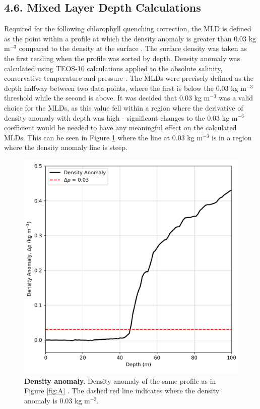 \documentclass[
	a4paper, %
	10pt, %
	unnumberedsections, %
	twoside, %
]{LTJournalArticle}
\begin{document}
\begin{multicols}{2}
\subsection{4.6. Mixed Layer Depth Calculations}
Required for the following chlorophyll quenching correction, the MLD is defined as the point within a profile at which the density
anomaly is greater than $0.03$ kg m$^{-3}$ compared to the density at the surface \citep{ref8}. The surface density was taken as the first
reading when the profile was sorted by depth. Density anomaly was calculated using TEOS-10 calculations applied to the absolute salinity,
conservative temperature and pressure \citep{ref9}. The MLDs were precisely defined as the depth halfway between two data points, where
the first is below the $0.03$ kg m$^{-3}$ threshold while the second is above.
It was decided that $0.03$ kg m$^{-3}$ was a valid choice for the MLDs,
as this value fell within a region where the derivative of density anomaly with depth was high - significant changes to the $0.03$ kg m$^{-3}$
coefficient would be needed to have any meaningful effect on the calculated MLDs. This can be seen in Figure \ref{fig:B} where the line at
$0.03$ kg m$^{-3}$ is in a region where the density anomaly line is steep.

\begin{figure}[H] 
	\includegraphics[width=\linewidth]{Louis/figures/figureB.png}
	\caption{\textbf{Density anomaly.} Density anomaly of the same profile as in Figure \ref{fig:A} . The dashed red line indicates where the density anomaly is $0.03$ kg m$^{-3}$.}
	\label{fig:B}
\end{figure} 


\end{multicols}
\end{document}
